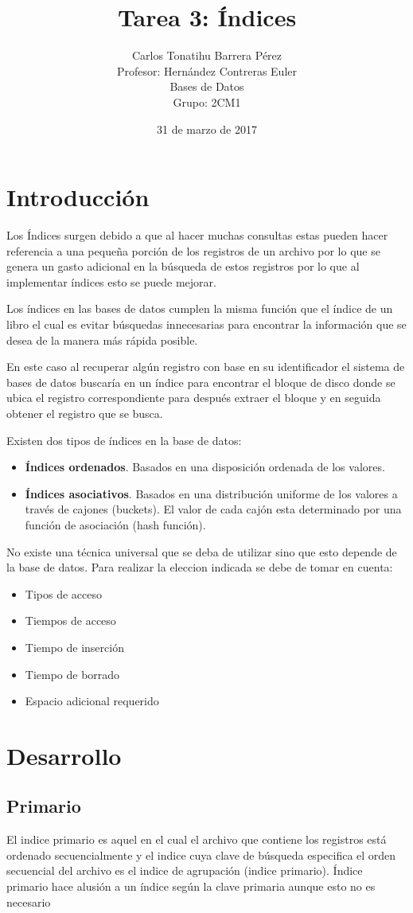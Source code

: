 \documentclass[12pt, titlepage]{article}
\title{Tarea 3: Índices}
\author{Carlos Tonatihu Barrera Pérez \\ Profesor: Hernández Contreras Euler \\ Bases de Datos \\ Grupo: 2CM1 }
\date{31 de marzo de 2017}
\begin{document}
	\maketitle
	\tableofcontents
	\section{Introducción}
	Los Índices surgen debido a que al hacer muchas consultas estas pueden hacer referencia a una pequeña porción de los registros de un archivo por lo que se genera un gasto adicional en la búsqueda de estos registros por lo que al implementar índices esto se puede mejorar.
	
	Los índices en las bases de datos cumplen la misma función que el índice de un libro el cual es evitar búsquedas innecesarias para encontrar la información que se desea de la manera más rápida posible. 
	
	En este caso al recuperar algún registro con base en su identificador el sistema de bases de datos buscaría en un índice para encontrar el bloque de disco donde se ubica el registro correspondiente para después extraer el bloque y en seguida obtener el registro que se busca.
	
	Existen dos tipos de índices en la base de datos:
	\begin{itemize}
		\item \textbf{Índices ordenados}. Basados en una disposición ordenada de los valores.
		\item \textbf{Índices asociativos}. Basados en una distribución uniforme de los valores a través de cajones (buckets). El valor de cada cajón esta determinado por una función de asociación (hash función). 
	\end{itemize}
	No existe una técnica universal que se deba de utilizar sino que esto depende de la base de datos. Para realizar la eleccion indicada se debe de tomar en cuenta:
	\begin{itemize}
		\item Tipos de acceso
		\item Tiempos de acceso
		\item Tiempo de inserción
		\item Tiempo de borrado
		\item Espacio adicional requerido
	\end{itemize}
	\section{Desarrollo}
	\subsection{Primario}
	El indice primario es aquel en el cual el archivo que contiene los registros está ordenado secuencialmente y el indice cuya clave de búsqueda especifica el orden secuencial del archivo es el indice de agrupación (indice primario). Índice primario hace alusión a un índice según la clave primaria aunque esto no es necesario
\end{document}
